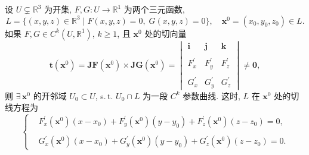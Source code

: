 \begin{example}\label{ex:9.1.13}
设 $U\subsetneq\mathbb{R}^{3}$ 为开集, $F, G\colon U \to \mathbb{R}^{1}$ 为两个三元函数,
\[
  L = \{(x, y, z) \in \mathbb{R}^{3} \mid F(x, y, z) = 0, \; G(x, y, z) = 0\},\quad
  \boldsymbol{x}^{0} = (x_{0}, y_{0}, z_{0}) \in L.
\]
如果 $F, G \in C^{k}(U, \mathbb{R}^{1})$, $k \geqslant 1$, 且 $\boldsymbol{x}^{0}$ 处的切向量
\[
  \boldsymbol{t}(\boldsymbol{x}^{0}) = \boldsymbol{J}\boldsymbol{F}(\boldsymbol{x}^{0}) \times
  \boldsymbol{J}\boldsymbol{G}(\boldsymbol{x}^{0}) =
  \begin{vmatrix}
    \boldsymbol{i} & \boldsymbol{j} & \boldsymbol{k} \\\\
    F_{x}^{\prime} & F_{y}^{\prime} & F_{z}^{\prime} \\\\
    G_{x}^{\prime} & G_{y}^{\prime} & G_{z}^{\prime}
  \end{vmatrix} \neq \boldsymbol{0},
\]
则 $\exists\,\boldsymbol{x}^{0}$ 的开邻域 $U_{0} \subset U$, s.\,t. $U_{0} \cap L$ 为一段 $C^{k}$ 参数曲线. 这时, $L$ 在 $\boldsymbol{x}^{0}$ 处的切线方程为
\[
  \left\{\begin{aligned}
    &F_{x}^{\prime}(\boldsymbol{x}^{0})(x - x_{0}) + F_{y}^{\prime}(\boldsymbol{x}^{0})(y - y_{0}) + F_{z}^{\prime}(\boldsymbol{x}^{0})(z - z_{0}) = 0, \\\\
    &G_{x}^{\prime}(\boldsymbol{x}^{0})(x - x_{0}) + G_{y}^{\prime}(\boldsymbol{x}^{0})(y - y_{0}) + G_{z}^{\prime}(\boldsymbol{x}^{0})(z - z_{0}) = 0.
  \end{aligned}\right.
\]


\end{example}
